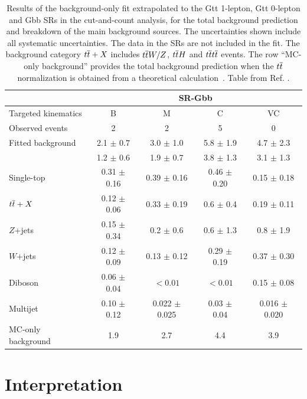 \begin{table}[htbp]
	\begin{tabular}{lcccc}
		\toprule
		& \multicolumn{4}{c}{SR-Gbb} \\
		\midrule
          Targeted kinematics & B            	&   	M   		&   C   &   VC                \\[-0.05cm]
		\midrule
		Observed events              & 2 & 2 & 5 & 0\\
		\midrule
		Fitted background           &   2.1 $\pm$ 0.7 & 3.0 $\pm$ 1.0 & 5.8 $\pm$ 1.9 & 4.7 $\pm$ 2.3\\
		\midrule
		\ttbar\            			& 1.2 $\pm$ 0.6 & 1.9 $\pm$ 0.7 & 3.8 $\pm$ 1.3 & 3.1 $\pm$ 1.3\\
		Single-top             		& 0.31 $\pm$ 0.16 & 0.39 $\pm$ 0.16 & 0.46 $\pm$ 0.20 & 0.15 $\pm$ 0.18\\
		$t\overline{t}+X$             		& 0.12 $\pm$ 0.06 & 0.33 $\pm$ 0.19 & 0.6 $\pm$ 0.4 & 0.19 $\pm$ 0.11\\
		$Z$+jets             		& 0.15 $\pm$ 0.34 & 0.2 $\pm$ 0.6 & 0.6 $\pm$ 1.3 & 0.8 $\pm$ 1.9\\
		$W$+jets             		& 0.12 $\pm$ 0.09 & 0.13 $\pm$ 0.12 & 0.29 $\pm$ 0.19 & 0.37 $\pm$ 0.30\\
		Diboson             		& 0.06 $\pm$ 0.04 & $<0.01$ & $<0.01$ & 0.15 $\pm$ 0.08\\
                Multijet              & 0.10 $\pm$ 0.12 & 0.022 $\pm$ 0.025 & 0.03 $\pm$ 0.04 & 0.016 $\pm$ 0.020\\
		 \midrule
 		MC-only background & 1.9 & 2.7 & 4.4 & 3.9  \\  
		\bottomrule
	\end{tabular}
\caption{Results of the background-only fit extrapolated to the Gtt 1-lepton, Gtt 0-lepton and Gbb SRs in
	the cut-and-count analysis, for the total background prediction and breakdown of the main background sources. 
	The uncertainties shown include all systematic uncertainties. The data in the SRs are not included in the fit. 
	The background category $t\overline{t}+X$ includes $t\overline{t} W/Z$, $t\overline{t} H$ and $t\overline{t} t\overline{t}$ events.
	The row ``MC-only background'' provides the total background prediction when the
	$t\overline{t}$ normalization is obtained from a theoretical
	calculation~\cite{Czakon:2011xx}.  Table from Ref. \cite{Aaboud:2017hrg}.
	}
	\label{tab:yield_discovery}
\end{table}


\FloatBarrier

\section{Interpretation}
\label{sec:strongprod:limits}

